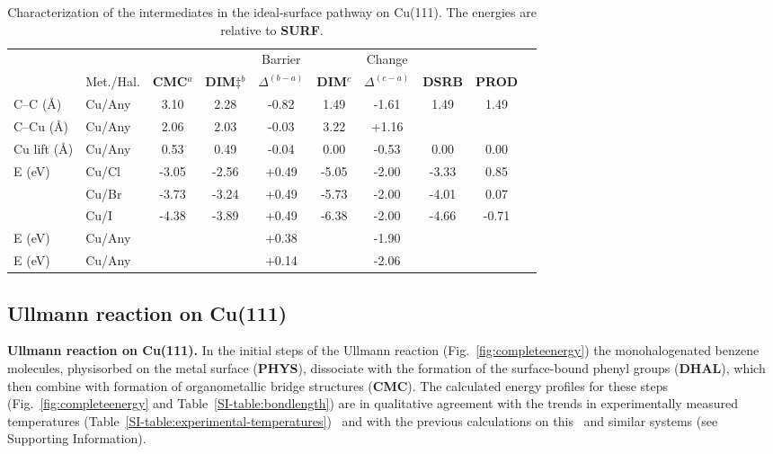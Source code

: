 \documentclass[aps,prb,amsmath,amssymb,11pt]{revtex4-1}
\newcommand{\sinfo}{Supporting Information}
\begin{document}
\begin{table}
\centering
\caption{Characterization of the intermediates in the ideal-surface pathway on Cu(111). %
The energies are relative to \textbf{SURF}.
}
\label{table:idealsurface}
\begin{tabular}{ llcccccccc  }
 \hline
 \hline
  & & &  & Barrier & & Change & &\\
  & Met./Hal. & \textbf{CMC}$^{a}$ & \textbf{DIM$\ddagger$}$^{b}$ & $\Delta^{(b-a)}$ &  \textbf{DIM}$^{c}$ & $\Delta^{(c-a)}$  & \textbf{DSRB} & \textbf{PROD} \\ 
 \hline 
 C--C (\si{\angstrom}) & Cu/Any & 3.10 & 2.28 & -0.82 & 1.49 & -1.61 & 1.49 & 1.49 \\ 
 \hline
 C--Cu (\si{\angstrom}) & Cu/Any & 2.06 & 2.03 & -0.03 & 3.22 & +1.16 & & \\
 \hline
 Cu lift (\si{\angstrom}) & Cu/Any & 0.53 & 0.49& -0.04  & 0.00 & -0.53 & 0.00 & 0.00 \\
 \hline
 \multirow{3}{*}{E (\si{\electronvolt}) } & Cu/Cl & -3.05 &-2.56 &+0.49 & -5.05 & -2.00& -3.33&0.85\\ 
 & Cu/Br & -3.73 & -3.24 &+0.49 & -5.73 & -2.00& -4.01&0.07\\ 
 & Cu/I  & -4.38 & -3.89 & +0.49 & -6.38 & -2.00& -4.66&-0.71\\ 
 \hline
 E (\si{\electronvolt})~\cite{pccp2010} & Cu/Any &  &  & +0.38& & -1.90 & & \\
 \hline
 E (\si{\electronvolt})~\cite{jacs2013} & Cu/Any & &  & +0.14& & -2.06 & &\\
 \hline
 \hline
\end{tabular}
\end{table}

\ifdefined\INTERNAL
\subsection{Ullmann reaction on Cu(111)}
\fi

\textbf{Ullmann reaction on Cu(111).}
%
In the initial steps of the Ullmann reaction (Fig.~\ref{fig:completeenergy}) the monohalogenated benzene molecules, physisorbed on the metal surface (\textbf{PHYS}), dissociate with the formation of the surface-bound phenyl groups (\textbf{DHAL}), which then combine with formation of organometallic bridge structures (\textbf{CMC}).
The calculated energy profiles for these steps (Fig.~\ref{fig:completeenergy} and Table~\ref{SI-table:bondlength}) are in qualitative agreement with the trends in experimentally measured temperatures (Table~\ref{SI-table:experimental-temperatures})~\cite{ullmann_52,ullmann_87,ullmann_67} and with the previous calculations on this~\cite{jacs2013,ullmann_88} and similar systems (see \sinfo). 
\end{document}
